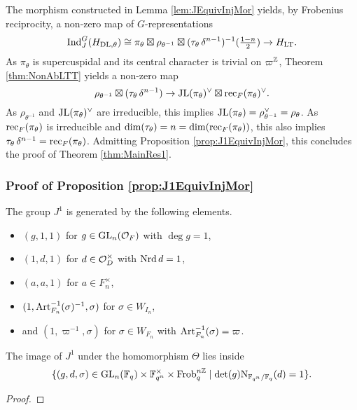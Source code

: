 \documentclass[../main.tex]{subfiles}
\begin{document}
The morphism constructed in Lemma \ref{lem:JEquivInjMor} yields, by Frobenius
reciprocity, a non-zero map of $G$-representations
\begin{equation} \label{eq:WantedMap}
  \mathrm{Ind}_{J}^G (H_{\mathrm{DL},\theta}) \cong \pi_\theta \boxtimes \rho_{\theta^{-1}}
  \boxtimes (\tau_\theta \, \delta^{n-1})^{-1}(\tfrac{1-n}2) \to H_{\mathrm{LT}}.
\end{equation}
As $\pi_\theta$ is supercuspidal and its central character is trivial on 
$\varpi^{\mathbb{Z}}$, Theorem \ref{thm:NonAbLTT} yields a non-zero map
\begin{equation*}
  \rho_{\theta^{-1}} \boxtimes (\tau_\theta \, \delta^{n-1}) \to
  \mathrm{JL}(\pi_\theta)^\vee \boxtimes \mathrm{rec}_F(\pi_\theta)^\vee.
\end{equation*}
As $\rho_{\theta^{-1}}$ and $\mathrm{JL}(\pi_\theta)^\vee$ are irreducible, this implies
$\mathrm{JL}(\pi_\theta) = \rho_{\theta^{-1}}^\vee = \rho_\theta$. As 
$\mathrm{rec}_F(\pi_\theta)$ is irreducible and $\dim(\tau_\theta) = n = \dim
(\mathrm{rec}_F(\pi_\theta))$, this also implies $\tau_\theta \, \delta^{n-1} =
\mathrm{rec}_F(\pi_\theta)$. Admitting Proposition \ref{prop:J1EquivInjMor}, this
concludes the proof of Theorem \ref{thm:MainRes1}.

\subsubsection{Proof of Proposition \ref{prop:J1EquivInjMor}} %
\label{ssub:Proof of Proposition}

\begin{lem}\label{lem:GeneratorsForJ1}
  The group $J^1$ is generated by the following elements.
  \begin{itemize}
    \item $(g,1,1)$ for $g \in \operatorname{GL}_n(\mathcal{O}_F)$ with $\deg g = 1$,
    \item $(1,d,1)$ for $d \in \mathcal{O}_D^\times$ with $\operatorname{Nrd} d = 1$, 
    \item $(a,a,1)$ for $a \in F_n^\times$, 
    \item $(1, \mathrm{Art}^{-1}_{F_n}(\sigma)^{-1}, \sigma)$ for $\sigma \in W_{I_n}$, 
    \item and $(1, \varpi^{-1}, \sigma)$ for $\sigma \in W_{F_n}$ with
              $\mathrm{Art}^{-1}_{F_n}(\sigma) = \varpi$. 
  \end{itemize}
  The image of $J^1$ under the homomorphism $\Theta$ lies inside  
  \begin{equation*}
    \{(g,d,\sigma) \in \operatorname{GL}_n(\mathbb{F}_q) \times \mathbb{F}_{q^n}^\times \times \mathrm{Frob}_q^{n\mathbb{Z}} \mid 
    \det(g) \mathrm{N}_{\mathbb{F}_{q^n}/\mathbb{F}_q}(d) = 1\}.
  \end{equation*}
\begin{proof}
\end{proof}
\end{lem}
\end{document}
